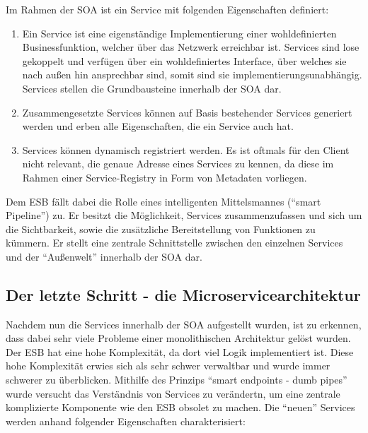 \begin{definition}
	Im Rahmen der \ac{SOA} ist ein Service mit folgenden Eigenschaften definiert: \autocite[S. 4]{microservice_enterprise}
	\begin{enumerate}
		\item Ein Service ist eine eigenständige Implementierung einer wohldefinierten Businessfunktion, welcher über das Netzwerk erreichbar ist. Services sind lose gekoppelt und verfügen über ein wohldefiniertes Interface, über welches sie nach außen hin ansprechbar sind, somit sind sie implementierungsunabhängig. Services stellen die Grundbausteine innerhalb der \ac{SOA} dar.
		\item Zusammengesetzte Services können auf Basis bestehender Services generiert werden und erben alle Eigenschaften, die ein Service auch hat.
		\item Services können dynamisch registriert werden. Es ist oftmals für den Client nicht relevant, die genaue Adresse eines Services zu kennen, da diese im Rahmen einer Service-Registry in Form von Metadaten vorliegen.
	\end{enumerate}
	Dem \ac{ESB} fällt dabei die Rolle eines intelligenten Mittelsmannes (\enquote{smart Pipeline}) zu. Er besitzt die Möglichkeit, Services zusammenzufassen und sich um die Sichtbarkeit, sowie die zusätzliche Bereitstellung von Funktionen zu kümmern. Er stellt eine zentrale Schnittstelle zwischen den einzelnen Services und der \enquote{Außenwelt} innerhalb der \ac{SOA} dar.
\end{definition}

\subsection{Der letzte Schritt - die Microservicearchitektur}

Nachdem nun die Services innerhalb der \ac{SOA} aufgestellt wurden, ist zu erkennen, dass dabei sehr viele Probleme einer monolithischen Architektur gelöst wurden. \autocite{Silveira2016} Der ESB hat eine hohe Komplexität, da dort viel Logik implementiert ist. Diese hohe Komplexität erwies sich als sehr schwer verwaltbar und wurde immer schwerer zu überblicken. Mithilfe des Prinzips \enquote{smart endpoints - dumb pipes} wurde versucht das Verständnis von Services zu verändertn, um eine zentrale komplizierte Komponente wie den ESB obsolet zu machen. Die \enquote{neuen} Services werden anhand folgender Eigenschaften charakterisiert:

